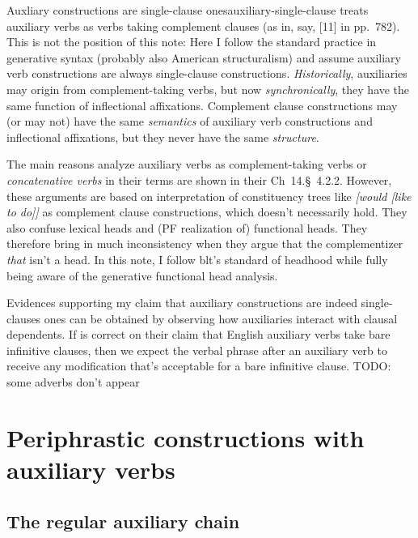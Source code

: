 \documentclass[UTF8, a4paper, oneside, scheme=plain]{ctexrep}
\newcommand*{\citesec}[1]{\S~{#1}}
\newcommand*{\citechap}[1]{Ch~{#1}}
\newcommand*{\citepage}[1]{pp.~{#1}}
\newcommand*{\citechapsec}[2]{\citechap{#1}.\citesec{#2}}
\newcommand*{\term}[1]{\emph{#1}}
\newcommand{\corpus}[1]{\emph{#1}}
\begin{document}
\begin{infobox}{Auxliary constructions are single-clause ones}{auxiliary-single-clause}
    \citet{cgel} treats auxiliary verbs as verbs taking complement clauses 
    (as in, say, [11] in \citepage{782}).
    This is not the position of this note:
    Here I follow the standard practice in generative syntax (probably also American structuralism) 
    and assume auxiliary verb constructions are always single-clause constructions.
    \emph{Historically}, auxiliaries may origin from complement-taking verbs,
    but now \emph{synchronically}, they have the same function of inflectional affixations.
    Complement clause constructions may (or may not) have the same \emph{semantics} of 
    auxiliary verb constructions and inflectional affixations,
    but they never have the same \emph{structure}.

    The main reasons \citet{cgel} analyze auxiliary verbs as complement-taking verbs or
    \term{concatenative verbs} in their terms 
    are shown in their \citechapsec{14}{4.2.2}.
    However, these arguments are based on interpretation of constituency trees like
    \corpus{[would [like to do]]} as complement clause constructions,
    which doesn't necessarily hold.
    They also confuse lexical heads and (PF realization of) functional heads.
    They therefore bring in much inconsistency when they argue that 
    the complementizer \corpus{that} isn't a head.
    In this note, I follow \acs{blt}'s standard of headhood
    while fully being aware of the generative functional head analysis.

    Evidences supporting my claim that auxiliary constructions are indeed single-clauses ones 
    can be obtained by observing how auxiliaries interact with clausal dependents.
    If \citet{cgel} is correct on their claim that English auxiliary verbs take bare infinitive clauses,
    then we expect the verbal phrase after an auxiliary verb to receive any modification 
    that's acceptable for a bare infinitive clause.
    TODO: some adverbs don't appear 
\end{infobox}

\section{Periphrastic constructions with auxiliary verbs}\label{sec:auxiliaries}

\subsection{The regular auxiliary chain}\label{sec:auxiliary-chain}
\end{document}
